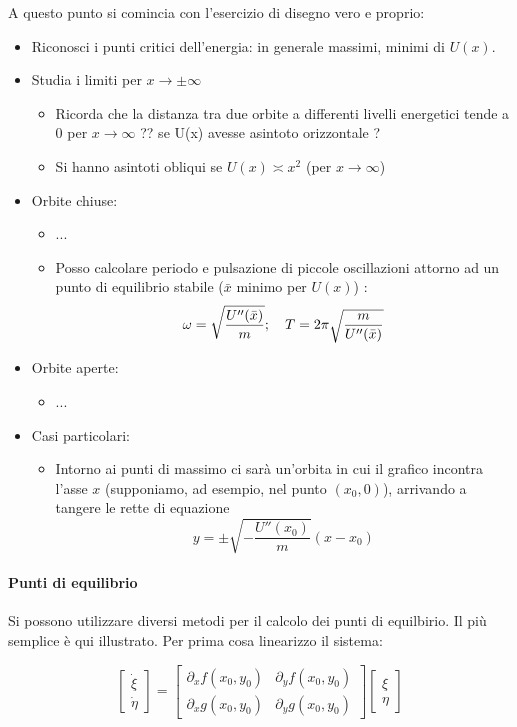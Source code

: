 \documentclass[a4paper,12pt]{article}
\begin{document}
A questo punto si comincia con l'esercizio di disegno vero e proprio:
\begin{itemize}
 \item Riconosci i punti critici dell'energia: in generale massimi, minimi di $U(x)$.
 \item Studia i limiti per $x\to\pm\infty$
 \begin{itemize}
  \item Ricorda che la distanza tra due orbite a differenti livelli energetici tende a $0$ per $x\to\infty$ {?? se U(x) avesse asintoto orizzontale ? } 
  \item Si hanno asintoti obliqui se $U(x)\asymp x^2$ (per $x\to\infty$)
 \end{itemize}

 \item Orbite chiuse:
 \begin{itemize}
  \item ...
  \item Posso calcolare periodo e pulsazione di piccole oscillazioni attorno ad un punto di equilibrio stabile ($\bar{x}$ minimo per $U(x)$) : $$\omega = \sqrt{U''(\bar{x})\over m};\ \ \ T = 2\pi\sqrt{m \over U''(\bar{x})}$$
 \end{itemize}
 \item Orbite aperte:
 \begin{itemize}
  \item ...
 \end{itemize}
 \item Casi particolari:
 \begin{itemize}
   \item Intorno ai punti di massimo ci sarà un'orbita in cui il grafico incontra l'asse $x$ (supponiamo, ad esempio, nel punto $(x_0, 0)$), arrivando a tangere le rette di equazione $$y = \pm\sqrt{-\dfrac{U''(x_0)}{m}}(x-x_0)$$
 \end{itemize}
\end{itemize}

\paragraph{Punti di equilibrio}
Si possono utilizzare diversi metodi per il calcolo dei punti di equilbirio. Il più semplice è qui illustrato.
Per prima cosa linearizzo il sistema:

$$\begin{bmatrix}\dot{\xi} \\ \dot{\eta} \end{bmatrix} 
= \begin{bmatrix} \partial_xf(x_0,y_0) & \partial_yf(x_0,y_0) \\ \partial_xg(x_0,y_0) & \partial_yg(x_0,y_0) \end{bmatrix} \begin{bmatrix}\xi \\ \eta \end{bmatrix}$$
\end{document}
